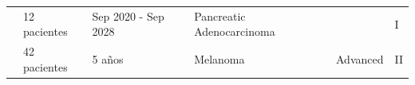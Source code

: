 \begin{table}[h]
{{\begin{tabular}{p{2cm}p{1.8cm}p{2cm}p{4.5cm}p{1.5cm}p{1cm}}
				
				
				
				
				\cite{bassani2019phase} & 12 pacientes & Sep 2020 - Sep 2028 & Pancreatic Adenocarcinoma & & I \\
				
				
				
				
				
				\cite{dillman2018randomized} & 42 pacientes & 5 años & Melanoma & Advanced & II \\
			\end{tabular}
		}
	}
\end{table}
